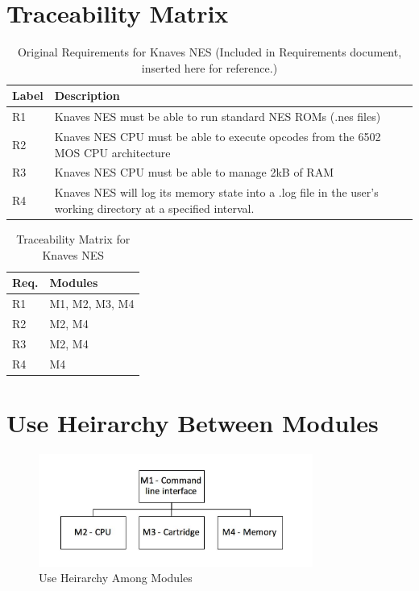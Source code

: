 \documentclass[12pt]{article}
\begin{document}
\section{Traceability Matrix}
	\begin{table}[H]
		\centering
		\begin{tabular}{ p{2in} p{2in} }
			\hline
			\textbf{Label} & \textbf{Description} \\
			\hline
			R1 & Knaves NES must be able to run standard NES ROMs (.nes files) \\
			R2 & Knaves NES CPU must be able to execute opcodes from the 6502 MOS CPU architecture\\
			R3 & Knaves NES CPU must be able to manage 2kB of RAM\\
			R4 & Knaves NES will log its memory state into a .log file in the user’s working directory at a specified interval.\\
		\end{tabular}
		\caption{Original Requirements for Knaves NES (Included in Requirements document, inserted here for reference.)}
	\end{table}

	\begin{table}[H]
		\centering
		\begin{tabular}{ p{2in}  p{2in} }
			\hline
			\textbf{Req.} & \textbf{Modules} \\
			\hline
			R1 & M1, M2, M3, M4\\
			R2 & M2, M4\\
			R3 & M2, M4\\
			R4 & M4\\
		\end{tabular}
		\caption{Traceability Matrix for Knaves NES}
	\end{table}



\section{Use Heirarchy Between Modules}
	\begin{figure}[H]
		\centering
		\includegraphics[width=90mm]{trace.jpg}
		\caption{Use Heirarchy Among Modules}
	\end{figure}
\end{document}
